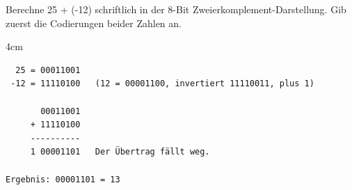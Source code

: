 \question[4]
Berechne 25 + (-12) schriftlich in der 8-Bit Zweierkomplement-Darstellung. Gib zuerst die Codierungen beider Zahlen an.
\begin{solutionbox}{4cm}
\begin{lstlisting}
  25 = 00011001
 -12 = 11110100   (12 = 00001100, invertiert 11110011, plus 1)

       00011001
     + 11110100
     ----------
     1 00001101   Der Übertrag fällt weg.

Ergebnis: 00001101 = 13
\end{lstlisting}
\end{solutionbox}
